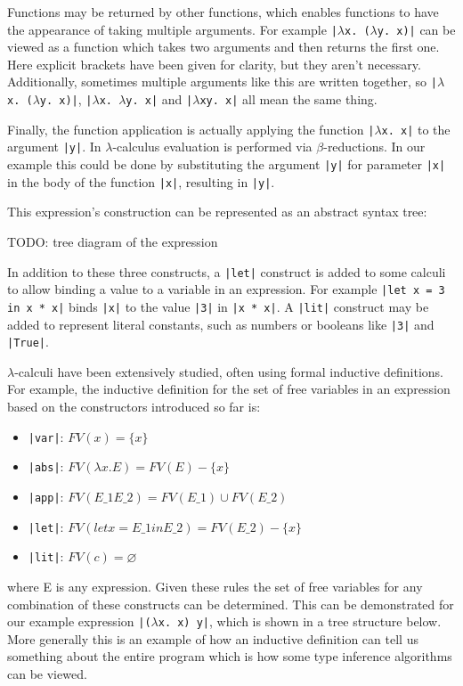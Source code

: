 \documentclass[a4paper,fleqn,12pt]{article}
\begin{document}
Functions may be returned by other functions, which enables functions to have the appearance of taking multiple arguments. For example \texttt{|$\lambda$x. ($\lambda$y. x)|} can be viewed as a function which takes two arguments and then returns the first one. Here explicit brackets have been given for clarity, but they aren’t necessary. Additionally, sometimes multiple arguments like this are written together, so \texttt{|$\lambda$x. ($\lambda$y. x)|}, \texttt{|$\lambda$x. $\lambda$y. x|} and \texttt{|$\lambda$xy. x|} all mean the same thing.

Finally, the function application is actually applying the function \texttt{|$\lambda$x. x|} to the argument \texttt{|y|}. In $\lambda$-calculus evaluation is performed via $\beta$-reductions. In our example this could be done by substituting the argument \texttt{|y|} for parameter \texttt{|x|} in the body of the function \texttt{|x|}, resulting in \texttt{|y|}.

This expression’s construction can be represented as an abstract syntax tree:

TODO: tree diagram of the expression

In addition to these three constructs, a \texttt{|let|} construct is added to some calculi to allow binding a value to a variable in an expression. For example \texttt{|let x = 3 in x * x|} binds \texttt{|x|} to the value \texttt{|3|} in \texttt{|x * x|}. A \texttt{|lit|} construct may be added to represent literal constants, such as numbers or booleans like \texttt{|3|} and \texttt{|True|}.

$\lambda$-calculi have been extensively studied, often using formal inductive definitions. For example, the inductive definition for the set of free variables in an expression based on the constructors introduced so far is:
\begin{itemize}
  \item \texttt{|var|}: $FV(x) = \{ x \}$
  \item \texttt{|abs|}: $FV(\lambda x. E) = FV(E) - \{ x \}$
  \item \texttt{|app|}: $FV(E\_1 E\_2) = FV(E\_1) \cup FV(E\_2)$
  \item \texttt{|let|}: $FV(let x = E\_1 in E\_2) = FV(E\_2) - \{ x \}$
  \item \texttt{|lit|}: $FV(c) = \varnothing$
\end{itemize}
where E is any expression. Given these rules the set of free variables for any combination of these constructs can be determined. This can be demonstrated for our example expression \texttt{|($\lambda$x. x) y|}, which is shown in a tree structure below. More generally this is an example of how an inductive definition can tell us something about the entire program which is how some type inference algorithms can be viewed.
\end{document}
